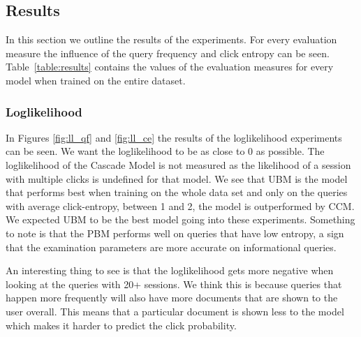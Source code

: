\subsection{Results}
In this section we outline the results of the experiments. For every evaluation measure the influence of the query frequency and click entropy can be seen. Table~\ref{table:results} contains the values of the evaluation measures for every model when trained on the entire dataset.

\subsubsection{Loglikelihood}
In Figures \ref{fig:ll_qf} and \ref{fig:ll_ce} the results of the loglikelihood experiments can be seen. We want the loglikelihood to be as close to 0 as possible. The loglikelihood of the Cascade Model is not measured as the likelihood of a session with multiple clicks is undefined for that model. We see that UBM is the model that performs best when training on the whole data set and only on the queries with average click-entropy, between 1 and 2, the model is outperformed by CCM. We expected UBM to be the best model going into these experiments. Something to note is that the PBM performs well on queries that have low entropy, a sign that the examination parameters are more accurate on informational queries.

An interesting thing to see is that the loglikelihood gets more negative when looking at the queries with 20+ sessions. We think this is because queries that happen more frequently will also have more documents that are shown to the user overall. This means that a particular document is shown less to the model which makes it harder to predict the click probability.

